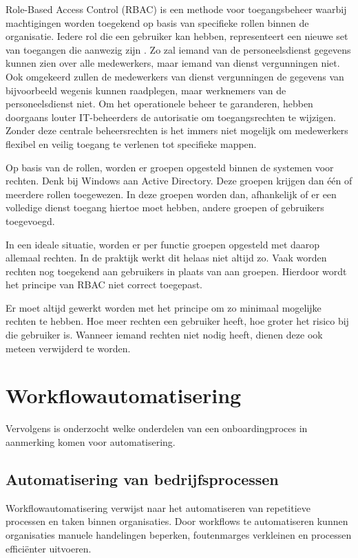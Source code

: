 Role-Based Access Control (RBAC) is een methode voor toegangsbeheer waarbij machtigingen worden toegekend op basis van specifieke rollen binnen de organisatie. Iedere rol die een gebruiker kan hebben, representeert een nieuwe set van toegangen die aanwezig zijn \autocite{Lindemulder}. Zo zal iemand van de personeelsdienst gegevens kunnen zien over alle medewerkers, maar iemand van dienst vergunningen niet. Ook omgekeerd zullen de medewerkers van dienst vergunningen de gegevens van bijvoorbeeld wegenis kunnen raadplegen, maar werknemers van de personeelsdienst niet. Om het operationele beheer te garanderen, hebben doorgaans louter IT-beheerders de autorisatie om toegangsrechten te wijzigen. Zonder deze centrale beheersrechten is het immers niet mogelijk om medewerkers flexibel en veilig toegang te verlenen tot specifieke mappen.

Op basis van de rollen, worden er groepen opgesteld binnen de systemen voor rechten. Denk bij Windows aan Active Directory. Deze groepen krijgen dan één of meerdere rollen toegewezen. In deze groepen worden dan, afhankelijk of er een volledige dienst toegang hiertoe moet hebben, andere groepen of gebruikers toegevoegd. 

In een ideale situatie, worden er per functie groepen opgesteld met daarop allemaal rechten. In de praktijk werkt dit helaas niet altijd zo. Vaak worden rechten nog toegekend aan gebruikers in plaats van aan groepen. Hierdoor wordt het principe van RBAC niet correct toegepast. 

Er moet altijd gewerkt worden met het principe om zo minimaal mogelijke rechten te hebben. Hoe meer rechten een gebruiker heeft, hoe groter het risico bij die gebruiker is. Wanneer iemand rechten niet nodig heeft, dienen deze ook meteen verwijderd te worden. 

\section{Workflowautomatisering}

Vervolgens is onderzocht welke onderdelen van een onboardingproces in aanmerking komen voor automatisering.

\subsection{Automatisering van bedrijfsprocessen}

Workflowautomatisering verwijst naar het automatiseren van repetitieve processen en taken binnen organisaties. Door workflows te automatiseren kunnen organisaties manuele handelingen beperken, foutenmarges verkleinen en processen efficiënter uitvoeren.

